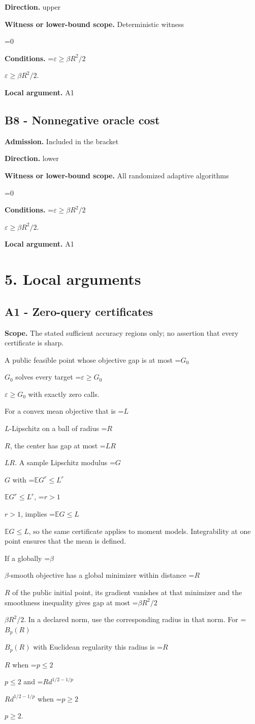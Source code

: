 \documentclass[10pt,a4paper]{article}
\newcommand{\AtlasMath}[1]{\par\begingroup\centering\setbox0=\hbox{$\displaystyle #1$}\ifdim\wd0>1.4\linewidth\typeout{ATLAS WIDE FORMULA: \the\wd0}\fi\ifdim\wd0>\linewidth\resizebox{\linewidth}{!}{\box0}\else\box0\fi\par\endgroup}
\newcommand{\AtlasInlineMath}[1]{\begingroup\setbox0=\hbox{$#1$}\ifdim\wd0>.4\linewidth\endgroup\AtlasMath{#1}\else\endgroup$#1$\fi}
\begin{document}
\textbf{Direction.} upper

\textbf{Witness or lower-bound scope.} Deterministic witness

\AtlasMath{0}
\textbf{Conditions.} \AtlasInlineMath{\varepsilon\ge \beta R^2/2}.

\textbf{Local argument.} A1

\subsection{B8 - Nonnegative oracle cost}
\textbf{Admission.} Included in the bracket

\textbf{Direction.} lower

\textbf{Witness or lower-bound scope.} All randomized adaptive algorithms

\AtlasMath{0}
\textbf{Conditions.} \AtlasInlineMath{\varepsilon\ge \beta R^2/2}.

\textbf{Local argument.} A1

\section{5. Local arguments}
\subsection{A1 - Zero-query certificates}
\textbf{Scope.} The stated sufficient accuracy regions only; no assertion that every certificate is sharp.

A public feasible point whose objective gap is at most \AtlasInlineMath{G_0} solves every target \AtlasInlineMath{\varepsilon\ge G_0} with exactly zero calls.

For a convex mean objective that is \AtlasInlineMath{L}-Lipschitz on a ball of radius \AtlasInlineMath{R}, the center has gap at most \AtlasInlineMath{LR}. A sample Lipschitz modulus \AtlasInlineMath{G} with \AtlasInlineMath{\mathbb E G^r\le L^r}, \AtlasInlineMath{r>1}, implies \AtlasInlineMath{\mathbb E G\le L}, so the same certificate applies to moment models. Integrability at one point ensures that the mean is defined.

If a globally \AtlasInlineMath{\beta}-smooth objective has a global minimizer within distance \AtlasInlineMath{R} of the public initial point, its gradient vanishes at that minimizer and the smoothness inequality gives gap at most \AtlasInlineMath{\beta R^2/2}. In a declared norm, use the corresponding radius in that norm. For \AtlasInlineMath{B_p(R)} with Euclidean regularity this radius is \AtlasInlineMath{R} when \AtlasInlineMath{p\le2} and \AtlasInlineMath{R d^{1/2-1/p}} when \AtlasInlineMath{p\ge2}.
\end{document}
